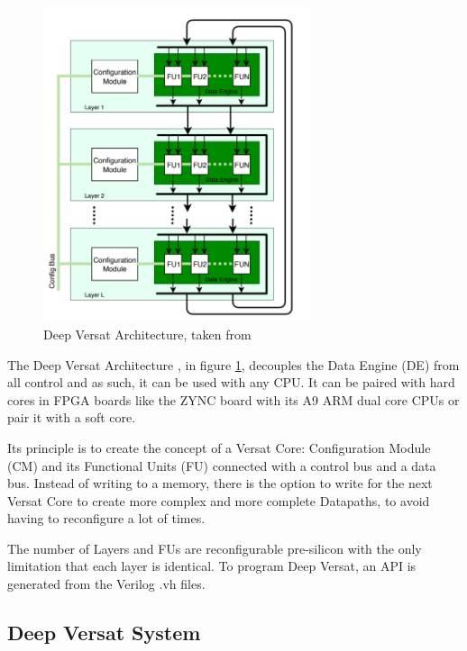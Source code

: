 \begin{figure}[!htb]
    \centering
    \includegraphics[width=0.7\textwidth]{Figures/deep-versat.png}
    \caption{Deep Versat Architecture, taken from~\cite{valter:deepversat}}
    \label{figure:deepversatarch}
\end{figure} 

\quad The Deep Versat Architecture\cite{valter:deepversat}
, in figure \ref{figure:deepversatarch}, decouples the Data Engine (DE) from all control and as such, it can be used with any CPU. 
It can be paired with hard cores in
FPGA boards like the ZYNC board %
with its A9 ARM dual core CPUs or pair it with a soft core.

Its principle is to create the concept of a Versat Core: Configuration Module (CM) and its Functional Units (FU) connected with a control bus and a data bus.
Instead of writing to a memory, there is the option to write for the next
Versat Core to create more complex and more complete Datapaths, to avoid
having to reconfigure a lot of times.

The number of Layers and FUs are reconfigurable pre-silicon with the only limitation
that each layer is identical. To program Deep Versat, an API is generated
from the Verilog .vh files. 




\newpage
\subsection{Deep Versat System}

